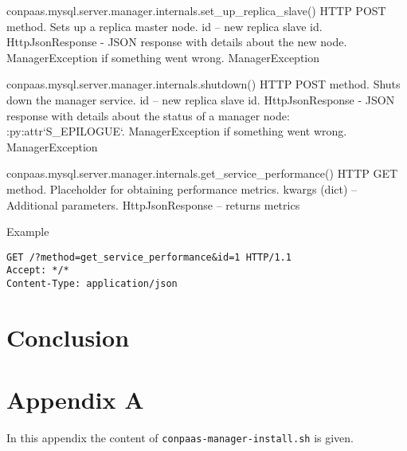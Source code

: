 \documentclass[a4paper,10pt]{article}
\begin{document}
\noindent\conapi
{ conpaas.mysql.server.manager.internals.set\_up\_replica\_slave()}
{HTTP POST method. Sets up a replica master node.}
{  id -- new replica slave id.}
{ HttpJsonResponse - JSON response with details about the new
      node. ManagerException if something went wrong.}
{ManagerException}


\noindent\conapi
{ conpaas.mysql.server.manager.internals.shutdown()}
{HTTP POST method. Shuts down the manager service.}
{  id -- new replica slave id.}
{ HttpJsonResponse - JSON response with details about the status
      of a manager node: :py:attr`S\_EPILOGUE`. ManagerException if
      something went wrong.}
{ManagerException}

\noindent\conapi
{ conpaas.mysql.server.manager.internals.get\_service\_performance()}
{ HTTP GET method. Placeholder for obtaining performance metrics.}
{ kwargs (dict) -- Additional parameters.}
{HttpJsonResponse -- returns metrics}
{}

Example
\begin{Verbatim}[frame=single]
GET /?method=get_service_performance&id=1 HTTP/1.1
Accept: */*
Content-Type: application/json
\end{Verbatim}

\newpage

\section{Conclusion}

\newpage

\section{Appendix A}
\label{app:install}

In this appendix the content of {\tt conpaas-manager-install.sh} is given.
\end{document}

